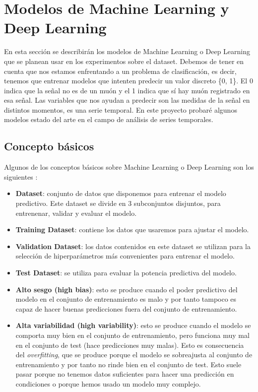 \section{Modelos de Machine Learning y Deep Learning}

En esta sección se describirán los modelos de Machine Learning o Deep Learning que se planean usar en los experimentos sobre el dataset. Debemos de tener en cuenta que nos estamos enfrentando a un problema de clasificación, es decir, tenemos que entrenar modelos que intenten predecir un valor discreto \{0, 1\}. El 0 indica que la señal no es de un muón y el 1 indica que sí hay muón registrado en esa señal. Las variables que nos ayudan a predecir son las medidas de la señal en distintos momentos, es una serie temporal. En este proyecto probaré algunos modelos estado del arte en el campo de análisis de series temporales.

\subsection{Concepto básicos}

Algunos de los conceptos básicos sobre Machine Learning o Deep Learning son los siguientes \cite{mlcoursera}:

\begin{itemize}
	\item \textbf{Dataset}: conjunto de datos que disponemos para entrenar el modelo predictivo. Este dataset se divide en 3 subconjuntos disjuntos, para entrenenar, validar y evaluar el modelo.
	\item \textbf{Training Dataset}: contiene los datos que usaremos para ajustar el modelo.
	\item \textbf{Validation Dataset}: los datos contenidos en este dataset se utilizan para la selección de hiperparámetros más convenientes para entrenar el modelo.
	\item \textbf{Test Dataset}: se utiliza para evaluar la potencia predictiva del modelo.
	\item \textbf{Alto sesgo (high bias)}: esto se produce cuando el poder predictivo del modelo en el conjunto de entrenamiento es malo y por tanto tampoco es capaz de hacer buenas predicciones fuera del conjunto de entrenamiento.
	\item \textbf{Alta variabilidad (high variability)}: esto se produce cuando el modelo se comporta muy bien en el conjunto de entrenamiento, pero funciona muy mal en el conjunto de test (hace predicciones muy malas). Esto es consecuencia del \textit{overfitting}, que se produce porque el modelo se sobreajusta al conjunto de entrenamiento y por tanto no rinde bien en el conjunto de test. Esto suele pasar porque no tenemos datos suficientes para hacer una predicción en condiciones o porque hemos usado un modelo muy complejo.
\end{itemize}

